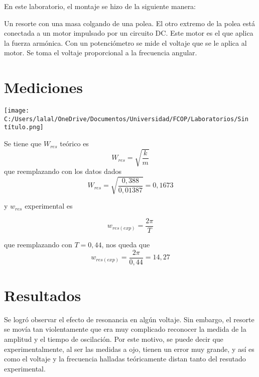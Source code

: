 \documentclass{article}
\begin{document}
En este laboratorio, el montaje se hizo de la siguiente manera:

Un resorte con una masa colgando de una polea. El otro 
extremo de la polea está conectada a un motor impulsado por un
circuito DC. Este motor es el que aplica la fuerza armónica.
Con un potenciómetro se mide el voltaje que se le aplica al
motor. Se toma el voltaje proporcional a la frecuencia angular.


\section{Mediciones}

\texttt{[image: C:/Users/lalal/OneDrive/Documentos/Universidad/FCOP/Laboratorios/Sin título.png]}

Se tiene que $W_{res}$ teórico es \[W_{res} = \sqrt{\frac{k}{m}}\]
que reemplazando con los datos dados 
\[W_{res} = \sqrt{\frac{0,388}{0,01387}} = 0,1673\]

y $w_{res}$ experimental es 

\[w_{res(exp)} = \frac{2\pi}{T}\]

que reemplazando con $T = 0,44$, nos queda que 
\[w_{res(exp)} = \frac{2\pi}{0,44} = 14,27\]


\section{Resultados}

Se logró observar el efecto de resonancia en algún
voltaje. Sin embargo, el resorte se movía tan 
violentamente que era muy complicado reconocer 
la medida de la amplitud y el tiempo de oscilación. Por este motivo, se puede 
decir que experimentalmente, al ser las medidas a ojo, 
tienen un error muy grande, y así es como el voltaje 
y la frecuencia halladas teóricamente distan tanto del
resutado experimental. 
 
\end{document}
